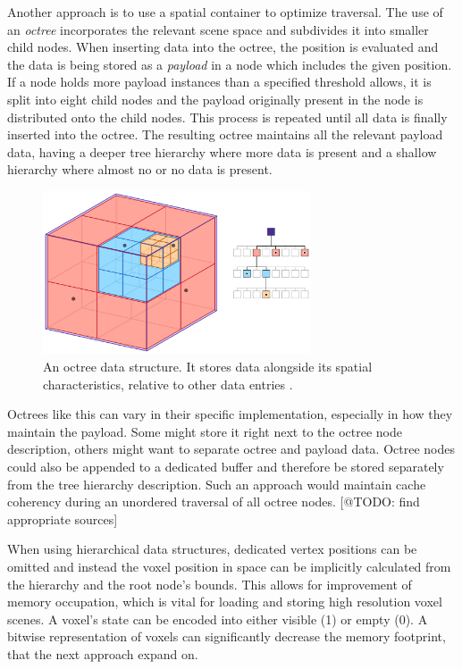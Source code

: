 Another approach is to use a spatial container to optimize traversal. The use of an \emph{octree} 
incorporates the relevant scene space and subdivides it into smaller child nodes. When inserting data 
into the octree, the position is evaluated and the data is being stored as a \emph{payload} in 
a node which includes the given position. If a node holds more payload instances than a specified threshold 
allows, it is split into eight child nodes and the payload originally present in the node is 
distributed onto the child nodes. This process is repeated until all data is finally inserted 
into the octree. The resulting octree maintains all the relevant payload data, having a deeper tree 
hierarchy where more data is present and a shallow hierarchy where almost no or no data is present.

\begin{figure}[h]
    \centering
    \includegraphics[width=300px]{images/graphics/octree.png}
    \caption{An octree data structure. It stores data alongside its spatial characteristics, relative to 
    other data entries \cite{Six2021}.}
    \label{fig:octree}
\end{figure}

\noindent
Octrees like this can vary in their specific implementation, especially in how they maintain the 
payload. Some might store it right next to the octree node description, others might want to separate 
octree and payload data. Octree nodes could also be appended to a dedicated buffer and therefore be stored 
separately from the tree hierarchy description. Such an approach would maintain cache coherency during an 
unordered traversal of all octree nodes. [@TODO: find appropriate sources]

When using hierarchical data structures, dedicated vertex positions can be omitted and instead 
the voxel position in space can be implicitly calculated from the hierarchy and the root node's bounds. 
This allows for improvement of memory occupation, which is vital for loading and storing high 
resolution voxel scenes. A voxel's state can be encoded into either visible (1) or empty (0).
A bitwise representation of voxels can significantly decrease the memory footprint, that the next 
approach expand on.

